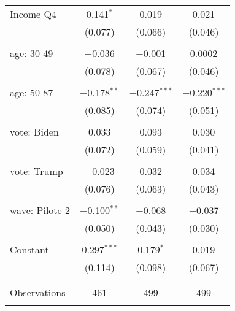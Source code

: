 \begin{tabular}{@{\extracolsep{5pt}}lccc}
 Income Q4 & 0.141$^{*}$ & 0.019 & 0.021 \\ 
  & (0.077) & (0.066) & (0.046) \\ 
  & & & \\ 
 age: 30-49 & $-$0.036 & $-$0.001 & 0.0002 \\ 
  & (0.078) & (0.067) & (0.046) \\ 
  & & & \\ 
 age: 50-87 & $-$0.178$^{**}$ & $-$0.247$^{***}$ & $-$0.220$^{***}$ \\ 
  & (0.085) & (0.074) & (0.051) \\ 
  & & & \\ 
 vote: Biden & 0.033 & 0.093 & 0.030 \\ 
  & (0.072) & (0.059) & (0.041) \\ 
  & & & \\ 
 vote: Trump & $-$0.023 & 0.032 & 0.034 \\ 
  & (0.076) & (0.063) & (0.043) \\ 
  & & & \\ 
 wave: Pilote 2 & $-$0.100$^{**}$ & $-$0.068 & $-$0.037 \\ 
  & (0.050) & (0.043) & (0.030) \\ 
  & & & \\ 
 Constant & 0.297$^{***}$ & 0.179$^{*}$ & 0.019 \\ 
  & (0.114) & (0.098) & (0.067) \\ 
  & & & \\ 
\hline \\[-1.8ex] 

Observations & 461 & 499 & 499 \\ 
\hline 
\hline \\[-1.8ex] 
\end{tabular} 